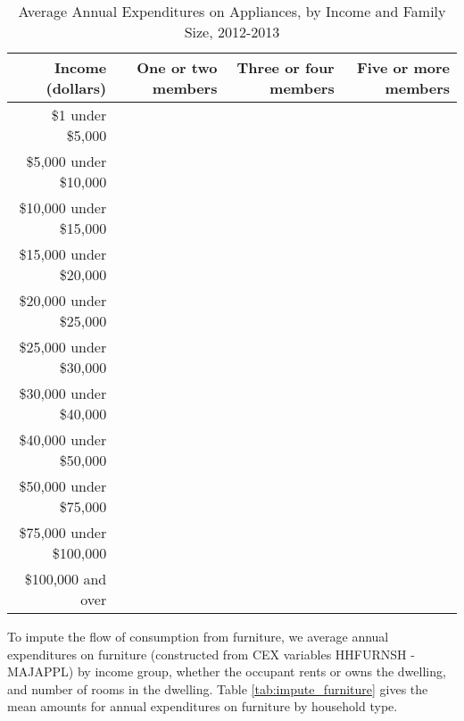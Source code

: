 \documentclass[article,11pt,letterpaper,fleqn]{article}
\theoremstyle{definition}
\numberwithin{equation}{section}
\begin{document}
\begin{table}[h!]
  \centering
  \caption{Average Annual Expenditures on Appliances, by Income and Family Size, 2012-2013}
    \begin{tabular}{rrrr}
    \hline
    \hline
    Income (dollars) & One or two members & Three or four members & Five or more members \\
    \hline
    \$1 under \$5,000 &       &       &  \\
    \$5,000 under \$10,000 &       &       &  \\
    \$10,000 under \$15,000 &       &       &  \\
    \$15,000 under \$20,000 &       &       &  \\
    \$20,000 under \$25,000 &       &       &  \\
    \$25,000 under \$30,000 &       &       &  \\
    \$30,000 under \$40,000 &       &       &  \\
    \$40,000 under \$50,000 &       &       &  \\
    \$50,000 under \$75,000 &       &       &  \\
    \$75,000 under \$100,000 &       &       &  \\
    \$100,000 and over &       &       &  \\
    \hline
    \hline
    \end{tabular}%
  \label{tab:impute_appliances}%
\end{table}%

To impute the flow of consumption from furniture, we average annual expenditures on furniture (constructed from CEX variables HHFURNSH - MAJAPPL) by income group, whether the occupant rents or owns the dwelling, and number of rooms in the dwelling.  Table \ref{tab:impute_furniture} gives the mean amounts for annual expenditures on furniture by household type.
\end{document}

